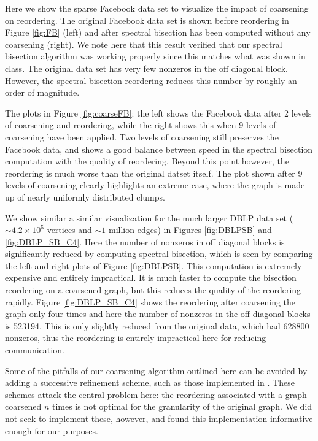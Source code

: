 \documentclass[11pt]{article}
\begin{document}
Here we show the sparse Facebook data set to visualize the impact of coarsening
on reordering. The original Facebook data set is shown before reordering in Figure
\ref{fig:FB} (left) and after spectral bisection has been computed without any
coarsening (right). We note here that this result verified that our spectral
bisection algorithm was working properly since this matches what was shown in
class. The original data set has very few nonzeros in the off diagonal block.
However, the spectral bisection reordering reduces this number by roughly an
order of magnitude. 

The plots in Figure \ref{fig:coarseFB}: the left shows the Facebook data after 2
levels of coarsening and reordering, while the right shows this when 9 levels of
coarsening have been applied. Two levels of coarsening still preserves the
Facebook data, and shows a good balance between speed in the spectral bisection
computation with the quality of reordering. Beyond this point however, the
reordering is much worse than the original datset itself. The plot shown after 9
levels of coarsening clearly highlights an extreme case, where the graph is made
up of nearly uniformly distributed clumps.

We show similar a similar visualization for the much larger DBLP data set ($\sim
4.2 \times 10^5$ vertices and $\sim 1$ million edges) in Figures
\ref{fig:DBLPSB} and \ref{fig:DBLP_SB_C4}. Here the number of nonzeros in off
diagonal blocks
is significantly reduced by computing spectral bisection, which is seen by
comparing the left and right
plots of Figure \ref{fig:DBLPSB}. This computation is extremely expensive and
entirely impractical. It is much faster to compute the bisection reordering on a
coarsened graph, but this reduces the quality of the reordering rapidly.
Figure \ref{fig:DBLP_SB_C4} shows the reordering after coarsening the graph only
four times and here the number of nonzeros in the off diagonal blocks is 523194.
This is only slightly reduced from the original data, which had 628800 nonzeros,
thus the reordering is entirely impractical here for reducing communication.

Some of the pitfalls of our coarsening algorithm outlined here can be avoided by
adding a successive refinement scheme, such as those implemented in
\cite{multilevel}. These schemes attack the central problem here: the reordering
associated with a graph coarsened $n$ times is not optimal for the granularity
of the original graph. We did not seek to implement these, however, and found
this implementation informative enough for our purposes. 
\end{document}
